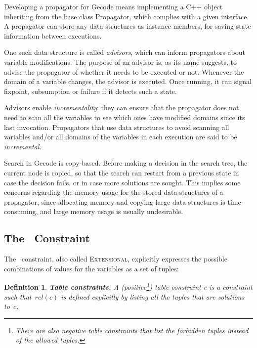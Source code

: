 \documentclass[a4paper,11pt]{article}
\newtheorem{definition}{Definition}
\newcommand{\Table}{\Constraint{Table}}
\newcommand{\Extensional}{\Constraint{Extensional}~}
\def\Extensional{\textsc{Extensional}}
\numberwithin{equation}{section}
\begin{document}
Developing a propagator for Gecode means implementing a C++ object
inheriting from the base class Propagator,
which complies with a given interface.
A propagator can store any data structures as instance members,
for saving state information between executions.

One such data structure is called \emph{advisors}, 
which can inform propagators about variable
modifications.
The purpose of an advisor is, as its name suggests, to advise
the propagator of whether it needs to be executed or not. 
Whenever the domain of a variable changes, the advisor is executed.
Once running, it can signal fixpoint, subsumption or failure if it detects
such a state. 

Advisors enable \emph{incrementality}: they can ensure
that the propagator does not need to scan all the variables to see
which ones have modified domains since its last invocation. Propagators that use
data structures to avoid scanning all variables and/or all domains
of the variables in each execution are said to be \emph{incremental}.

Search in Gecode is copy-based. Before making a decision in the search tree, the
current node is copied, so that the search can restart from a previous 
state in case the decision fails, or in case more solutions are sought.
This implies some concerns regarding the memory usage for the stored data structures
of a propagator, since allocating memory and copying large data structures
is time-consuming, and large memory usage is usually undesirable.




\subsection{The \Table~Constraint}
\label{bg:table}
The \Table~constraint, also called \Extensional,
explicitly expresses the possible combinations of values for the variables as a
set of tuples:

\begin{definition}
  \textbf{Table constraints.} A
  (positive\footnote{There are also negative table constraints that list the
    forbidden tuples instead of the allowed tuples.})
  \emph{table constraint c} is a
  constraint such that~$rel(c)$ is defined explicitly by listing all the
  tuples that are solutions to~$c$.
\end{definition}
\end{document}
